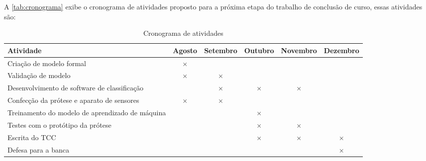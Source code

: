 A \autoref{tab:cronograma} exibe o cronograma de atividades proposto para a próxima etapa do trabalho de conclusão de curso, essas atividades são:

\begin{table}[htbp]
  \centering
  \caption{Cronograma de atividades}
  \label{tab:cronograma}
  \begin{tabularx}{\textwidth}{|X|c|c|c|c|c|}
    \hline
    \textbf{Atividade} & \textbf{Agosto} & \textbf{Setembro} & \textbf{Outubro} & \textbf{Novembro} & \textbf{Dezembro} \\
    \hline
    Criação de modelo formal & \(\times\) & & & & \\
    \hline
    Validação de modelo & \(\times\) & \(\times\)  &  & & \\
    \hline
    Desenvolvimento de software de classificação & & \(\times\) & \(\times\) & \(\times\) & \\
    \hline
    Confecção da prótese e aparato de sensores & \(\times\) & \(\times\) & & &  \\
    \hline
    Treinamento do modelo de aprendizado de máquina & & & \(\times\) & &  \\
    \hline
    Testes com o protótipo da prótese & & & \(\times\) & \(\times\) &  \\
    \hline
    Escrita do TCC & & & \(\times\) & \(\times\) &  \(\times\)\\
    \hline
    Defesa para a banca & & & & & \(\times\)  \\
    \hline
  \end{tabularx}
\end{table}